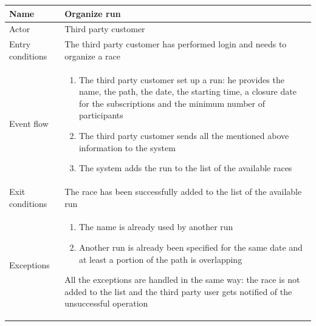 \begin{table}[H]
\begin{tabularx}{\textwidth}{|l|X|}
\hline
 Name & Organize run \\ \hline
 Actor & Third party customer \\ \hline
 Entry conditions & The third party customer has performed login and needs to organize a race\\ \hline
 Event flow & 
 \begin{enumerate}
 	\item The third party customer set up a run: he provides the name, the path, the date, the starting time, a closure date for the subscriptions and the minimum number of participants
  	\item The third party customer sends all the mentioned above information to the system
 	\item The system adds the run to the list of the available races
 \end{enumerate}   \\ \hline
 Exit conditions & The race has been successfully added to the list of the available run \\ \hline
 Exceptions & 
 \begin{enumerate}
 	\item The name is already used by another run
 	\item Another run is already been specified for the same date and at least a portion of the path is overlapping 
 \end{enumerate}  
 All the exceptions are handled in the same way: the race is not added to the list and the third party user gets notified of the unsuccessful operation 
 \\ \hline
\end{tabularx}
\end{table}


